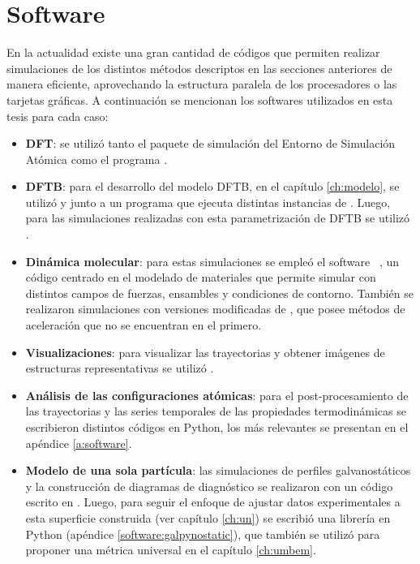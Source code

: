 \section{Software}

En la actualidad existe una gran cantidad de códigos que permiten realizar 
simulaciones de los distintos métodos descriptos en las secciones anteriores 
de manera eficiente, aprovechando la estructura paralela de los procesadores o 
las tarjetas gráficas. A continuación se mencionan los softwares utilizados 
en esta tesis para cada caso:
\begin{itemize}
    \item \textbf{DFT}: se utilizó tanto el paquete de simulación  
        \cite{enkovaara2010, mortensen2005} del Entorno de Simulación Atómica 
        \cite{larsen2017} como el programa   
        \cite{quantum_espresso, quantum_espresso_advanced}.
    \item \textbf{DFTB}: para el desarrollo del modelo DFTB, en el capítulo 
        \ref{ch:modelo}, se utilizó  \cite{hotcent} y
         \cite{tango} junto a un programa  que ejecuta
        distintas instancias de . Luego, para las simulaciones 
        realizadas con esta parametrización de DFTB se utilizó  
        \cite{dftb+}.
    \item \textbf{Dinámica molecular}: para estas simulaciones se empleó el 
        software  ~\cite{lammps1, lammps2}, un código centrado en 
        el modelado de materiales que permite simular con distintos campos de 
        fuerzas, ensambles y condiciones de contorno. También se realizaron 
        simulaciones con versiones modificadas de  \cite{gems}, que 
        posee métodos de aceleración que no se encuentran en el primero.
    \item \textbf{Visualizaciones}: para visualizar las trayectorias y obtener 
        imágenes de estructuras representativas se utilizó  \cite{vmd}.
    \item \textbf{Análisis de las configuraciones atómicas}: para el 
        post-procesamiento de las trayectorias y las series temporales de  las
        propiedades termodinámicas se escribieron distintos códigos en Python,
        los más relevantes se presentan en el apéndice \ref{a:software}.
    \item \textbf{Modelo de una sola partícula}: las simulaciones de perfiles 
        galvanostáticos y la construcción de diagramas de diagnóstico se 
        realizaron con un código escrito en . Luego, para seguir el 
        enfoque de ajustar datos experimentales a esta superficie construida 
        (ver capítulo \ref{ch:un}) se escribió una librería en Python 
        (apéndice \ref{software:galpynostatic}), que también se utilizó para 
        proponer una métrica universal en el capítulo \ref{ch:umbem}.
\end{itemize}
